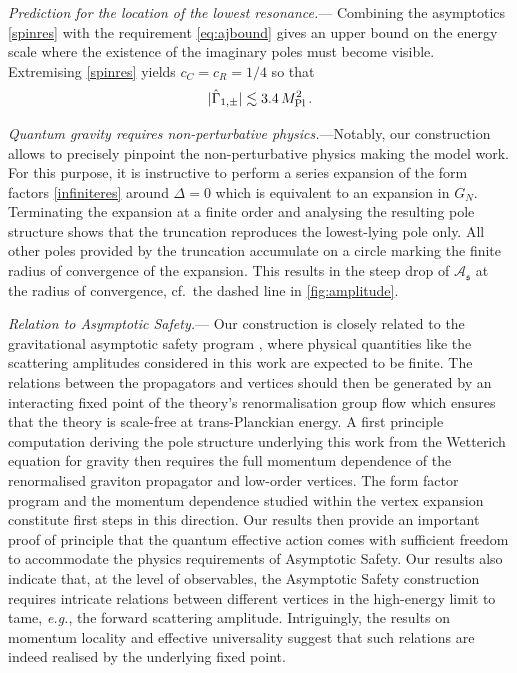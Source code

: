 \documentclass[aps,prl,reprint,twocolumn,superscriptaddress,longbibliography,nofootinbib,floatfix,showpacs]{revtex4-1}
\newcommand{\cA}{{\mathcal A}}
\newcommand{\eg}{{\textit{e.g.}}}
\newcommand{\be}{\begin{equation}}
\newcommand{\ee}{\end{equation}}
\newcommand{\mans}{\ensuremath{\mathfrak{s}}}
\newcommand{\ressym}{\hat{\Gamma}}
\begin{document}
\textit{Prediction for the location of the lowest resonance.}---
Combining the asymptotics \eqref{spinres} with the requirement \eqref{eq:ajbound} gives an upper bound on the energy scale where the existence of the imaginary poles must become visible.
Extremising \eqref{spinres} yields $c_C = c_R = 1/4$ so that
%
\be
|\ressym_{1,\pm}| \lesssim  3.4 \, M_{\rm Pl}^2 \, .
\ee
%

\textit{Quantum gravity requires non-perturbative physics.}---Notably, our construction allows to precisely pinpoint the non-perturbative physics making the model work.
For this purpose, it is instructive to perform a series expansion of the form factors \eqref{infiniteres} around $\Delta = 0$ which is equivalent to an expansion in $G_N$.
Terminating the expansion at a finite order and analysing the resulting pole structure shows  that the truncation reproduces the lowest-lying pole only.
All other poles provided by the truncation accumulate on a circle marking the finite radius of convergence of the expansion. This results in  the steep drop of $\cA_\mans$ at the radius of convergence, cf.\ the dashed line in \autoref{fig:amplitude}. 

\textit{Relation to Asymptotic Safety.}---
Our construction is closely related to the gravitational asymptotic safety program \cite{Weinberg:1976xy,Weinberg:1980gg}, where physical quantities like the scattering amplitudes considered in this work are expected to be finite.
The relations between the propagators and vertices should then be generated by an interacting fixed point of the theory's renormalisation group flow which ensures that the theory is scale-free at trans-Planckian energy.
A first principle computation deriving the pole structure underlying this work from the Wetterich equation for gravity \cite{Reuter:1996cp} then requires the full momentum dependence of the renormalised graviton propagator and low-order vertices.
The form factor program  \cite{Becker:2017tcx,Bosma:2019aiu,Knorr:2019atm} and the momentum dependence studied within the vertex expansion \cite{Christiansen:2014raa,Christiansen:2015rva,Meibohm:2015twa,Denz:2016qks,Christiansen:2017cxa,Eichhorn:2018ydy,Reichert:2020mja} constitute first steps in this direction.
Our results then provide an important proof of principle that the quantum effective action comes with sufficient freedom to accommodate the physics requirements of Asymptotic Safety.
Our results also indicate that, at the level of observables, the Asymptotic Safety construction requires intricate relations between different vertices in the high-energy limit to tame, \eg, the forward scattering amplitude.
Intriguingly, the results on momentum locality \cite{Christiansen:2015rva, Denz:2016qks} and effective universality \cite{Eichhorn:2018akn, Eichhorn:2018ydy, Meibohm:2015twa, Dona:2015tnf, Eichhorn:2017sok, Christiansen:2017cxa, Eichhorn:2018nda} suggest that such relations  are indeed realised by the underlying fixed point.
\end{document}
